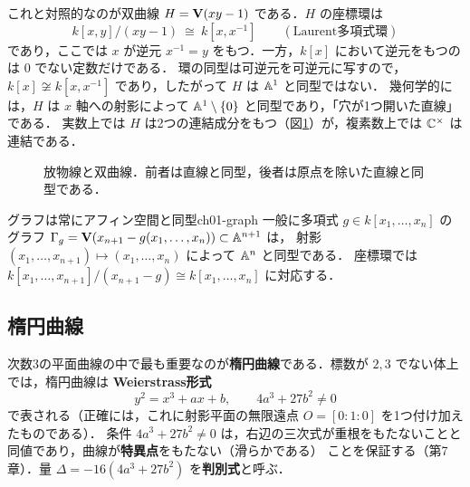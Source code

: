 これと対照的なのが双曲線 $H=\mathbf{V}(xy-1)$ である．$H$ の座標環は
\[
  k[x,y]/(xy-1)\ \cong\ k[x,x^{-1}]\qquad(\text{Laurent多項式環})
\]
であり，ここでは $x$ が逆元 $x^{-1}=y$ をもつ．一方，$k[x]$ において逆元をもつのは $0$ でない定数だけである．
環の同型は可逆元を可逆元に写すので，$k[x]\not\cong k[x,x^{-1}]$ であり，したがって $H$ は $\mathbb{A}^1$ と同型ではない．
幾何学的には，$H$ は $x$ 軸への射影によって $\mathbb{A}^1\setminus\{0\}$ と同型であり，「穴が1つ開いた直線」である．
実数上では $H$ は2つの連結成分をもつ（図\ref{fig:ch01-parabola-hyperbola}）が，複素数上では $\mathbb{C}^\times$ は連結である．

\begin{figure}[H]
\centering
{}
\caption{放物線と双曲線．前者は直線と同型，後者は原点を除いた直線と同型である．}
\label{fig:ch01-parabola-hyperbola}
\end{figure}

\begin{myex}{グラフは常にアフィン空間と同型}{ch01-graph}
一般に多項式 $g\in k[x_1,\dots,x_n]$ のグラフ $\Gamma_g=\mathbf{V}(x_{n+1}-g(x_1,\dots,x_n))\subset\mathbb{A}^{n+1}$ は，
射影 $(x_1,\dots,x_{n+1})\mapsto(x_1,\dots,x_n)$ によって $\mathbb{A}^n$ と同型である．
座標環では $k[x_1,\dots,x_{n+1}]/(x_{n+1}-g)\cong k[x_1,\dots,x_n]$ に対応する．
\end{myex}

\subsection{楕円曲線}

次数3の平面曲線の中で最も重要なのが\textbf{楕円曲線}である．標数が $2,3$ でない体上では，楕円曲線は
\textbf{Weierstrass形式}
\begin{equation}\label{eq:ch01-weierstrass}
  y^2=x^3+ax+b,\qquad 4a^3+27b^2\ne0
\end{equation}
で表される（正確には，これに射影平面の無限遠点 $O=[0:1:0]$ を1つ付け加えたものである）．
条件 $4a^3+27b^2\ne0$ は，右辺の三次式が重根をもたないことと同値であり，曲線が\textbf{特異点}をもたない（滑らかである）
ことを保証する（第7章）．量 $\Delta=-16(4a^3+27b^2)$ を\textbf{判別式}と呼ぶ．


